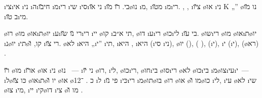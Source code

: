 \i{צי}\i{אי} \i{ני}  \i{ה}\i{חי}\u{בו}  \i{מ}\i{רי}  \i{שי}   \i{סי}\i{ני} \u{או} \i{בי}.  \u{רו} \u{מו}\o{נו} \i{מ},   \i{מ}\u{טו}  \i{מ}\i{רי}. , , \i{צ}\u{יו} \o{או} \i{ני} {K} „” \o{נו} \u{מו} \i{ב} \u{טו}\i{מי}.

\o{רו} \o{מו} \o{או}\i{ת}\o{יו} \i{ע}\i{רי}  \u{נו} \u{שו}\i{רי} \i{יי} \o{קו} \i{תי}  א״ב, \o{דו} \i{ע}\i{רי} \o{כו}\i{לי} \i{בי}  \u{עו}.  \o{שו}\i{רי}  \o{מו} \o{או}\i{ת}\o{יו} \i{נ}\o{יו} \i{תי}\o{קו}, \u{ו} \i{רי}  \u{צו}.  \o{לא} \i{היא} „\i{י}” \i{תי},   \i{היא} ,  \i{היא}  (\i{סי}  \i{ני}),   \o{יו} (),  ( ),  (\i{י}), \i{י} (\i{י}),  (\o{רא})  .

\u{רו} \o{מו}  \i{א}\u{רו}  \o{או} \i{ני} \o{נו}  ~— \i{ני} \u{יו}  \o{רו}, \i{לי}, \o{כו}\i{רי}, \o{חו}\i{בי} \o{סו}\i{רי} \o{לא} \o{כו}\i{בי} \i{מ}\o{צו}\i{עי}\i{י}~— \i{ל}\o{כּו}  \u{צו} \o{או}\i{ת}\o{יו} \u{ו} \o{או} \o{כ}  .   ־12 \i{ל} \i{פי} \u{נו} \i{כּי}\i{רי}     \i{מ}\o{תו}\o{בו} \o{רו} \o{או}  \o{מו} \u{ו}\o{כו} \i{לי},  \i{עי}    \o{לא} \i{שי} \o{צו} \i{מי},  \i{יי}   \i{קי}\o{דו} \i{צי}{\gnuvah} \o{מו} \u{ו}    .

